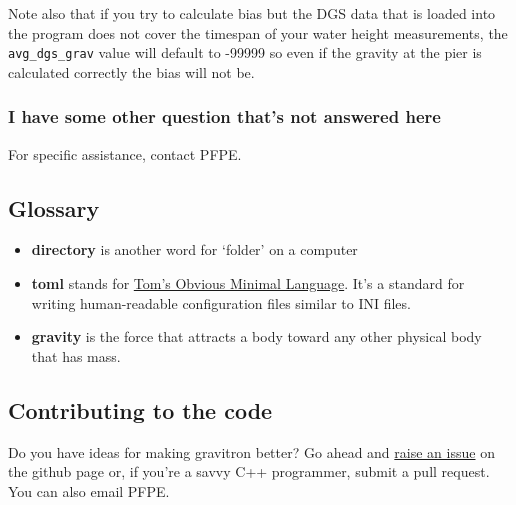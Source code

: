 \documentclass{pfpe-manual}
\begin{document}
Note also that if you try to calculate bias but the DGS data that is loaded into the program does not cover the timespan of your water height measurements, the \texttt{avg\_dgs\_grav} value will default to -99999 so even if the gravity at the pier is calculated correctly the bias will not be.

\subsubsection{I have some other question that's not answered here}
For specific assistance, contact PFPE.

\subsection{Glossary}
\begin{itemize}
\item \textbf{directory} is another word for `folder' on a computer
\item \textbf{toml} stands for \href{https://toml.io/}{Tom's Obvious Minimal Language}. It's a standard for writing human-readable configuration files similar to INI files.
\item \textbf{gravity} is the force that attracts a body toward any other physical body that has mass.
\end{itemize}

\subsection{Contributing to the code}
Do you have ideas for making gravitron better? Go ahead and \href{https://github.com/hfmark/gravitron/issues}{raise an issue} on the github page or, if you're a savvy C++ programmer, submit a pull request. You can also email PFPE.
\end{document}
